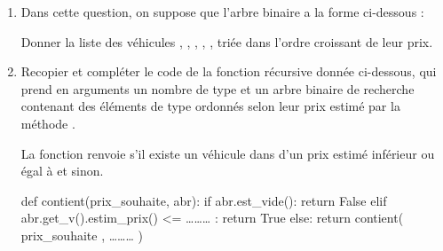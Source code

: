 \documentclass[11pt,a4paper,french,twoside]{PMCours}
\begin{document}
\begin{enumerate}
\begin{enumerate}
\item Dans cette question, on suppose que l'arbre binaire  a la forme ci-dessous :
\begin{center}
\end{center}
Donner la liste des véhicules , , , , ,  triée dans l'ordre croissant de leur prix.
\item Recopier et compléter le code de la fonction récursive  donnée ci-dessous, qui
prend en arguments un nombre  de type  et un arbre binaire de recherche  contenant des éléments de type  ordonnés selon leur prix estimé par la méthode . 

La fonction  renvoie  s'il existe un véhicule dans  d'un prix estimé inférieur ou égal à  et  sinon.

\pagebreak
\begin{Python*}
def contient(prix_souhaite, abr):
    if abr.est_vide():
        return False
    elif abr.get_v().estim_prix() <= ……… :
        return True 
    else:
        return contient( prix_souhaite , ……… ) 
\end{Python*}
\end{enumerate}
\end{enumerate}
\end{document}
